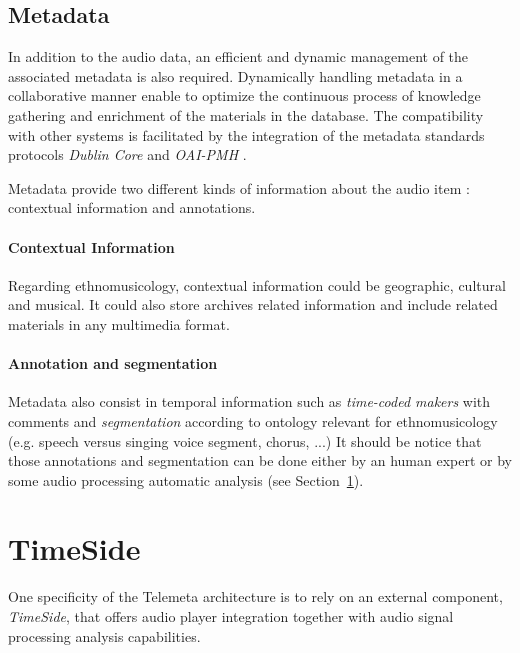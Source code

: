 \documentclass[runningheads,a4paper]{llncs}
\begin{document}
\subsection{Metadata}\label{sec:metadata}
In addition to the audio data, an efficient and dynamic management of the associated metadata is also required. %
Dynamically handling metadata in a collaborative manner enable to optimize the continuous process of knowledge gathering and enrichment of the materials in the database.  
The compatibility with other systems is facilitated by the integration of the metadata standards protocols \emph{Dublin Core} and \emph{OAI-PMH} \cite{DublinCore,OAI-PMH}.

Metadata provide two different kinds of information about the audio item : contextual information and annotations.

\paragraph{Contextual Information}
Regarding ethnomusicology, contextual information could be geographic, cultural and musical. It could also store archives related information and include related materials in any multimedia format.  
\paragraph{Annotation and segmentation}
Metadata also consist in temporal information such as \emph{time-coded makers} with comments and \emph{segmentation} according to ontology relevant for ethnomusicology (e.g. speech versus singing voice segment, chorus, ...)
It should be notice that those annotations and segmentation can be done either by an human expert or by some audio processing automatic analysis (see Section~\ref{sec:Timeside}).


\section{TimeSide}\label{sec:Timeside}
One specificity of the Telemeta architecture is to rely on an external component, \emph{TimeSide}, that offers audio player integration together with audio signal processing analysis capabilities.
 
\end{document}
